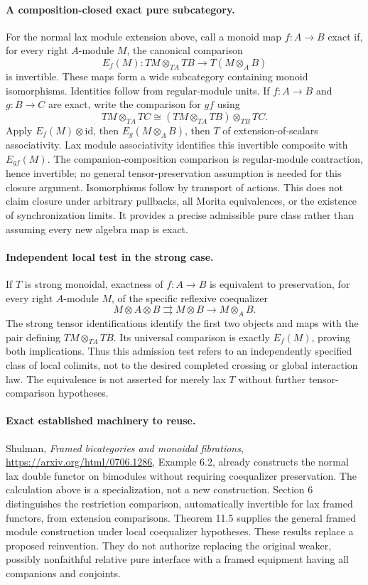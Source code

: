 \documentclass{article}
\begin{document}
\paragraph{A composition-closed exact pure subcategory.} For the normal lax module extension above, call a monoid map $f:A\to B$ exact if, for every right $A$-module $M$, the canonical comparison
\[
 E_f(M):TM\otimes_{TA}TB\longrightarrow T(M\otimes_A B)
\]
is invertible. These maps form a wide subcategory containing monoid isomorphisms. Identities follow from regular-module units. If $f:A\to B$ and $g:B\to C$ are exact, write the comparison for $gf$ using
\[
 TM\otimes_{TA}TC\cong (TM\otimes_{TA}TB)\otimes_{TB}TC.
\]
Apply $E_f(M)\otimes\mathrm{id}$, then $E_g(M\otimes_A B)$, then $T$ of extension-of-scalars associativity. Lax module associativity identifies this invertible composite with $E_{gf}(M)$. The companion-composition comparison is regular-module contraction, hence invertible; no general tensor-preservation assumption is needed for this closure argument. Isomorphisms follow by transport of actions. This does not claim closure under arbitrary pullbacks, all Morita equivalences, or the existence of synchronization limits. It provides a precise admissible pure class rather than assuming every new algebra map is exact.

\paragraph{Independent local test in the strong case.} If $T$ is strong monoidal, exactness of $f:A\to B$ is equivalent to preservation, for every right $A$-module $M$, of the specific reflexive coequalizer
\[
 M\otimes A\otimes B\rightrightarrows M\otimes B\longrightarrow M\otimes_A B.
\]
The strong tensor identifications identify the first two objects and maps with the pair defining $TM\otimes_{TA}TB$. Its universal comparison is exactly $E_f(M)$, proving both implications. Thus this admission test refers to an independently specified class of local colimits, not to the desired completed crossing or global interaction law. The equivalence is not asserted for merely lax $T$ without further tensor-comparison hypotheses.

\paragraph{Exact established machinery to reuse.} Shulman, \emph{Framed bicategories and monoidal fibrations}, \url{https://arxiv.org/html/0706.1286}, Example 6.2, already constructs the normal lax double functor on bimodules without requiring coequalizer preservation. The calculation above is a specialization, not a new construction. Section 6 distinguishes the restriction comparison, automatically invertible for lax framed functors, from extension comparisons. Theorem 11.5 supplies the general framed module construction under local coequalizer hypotheses. These results replace a proposed reinvention. They do not authorize replacing the original weaker, possibly nonfaithful relative pure interface with a framed equipment having all companions and conjoints.
\end{document}
